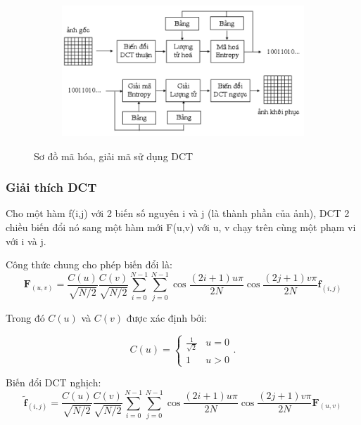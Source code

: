 \begin{figure}
    \begin{subfigure}{0.8\textwidth}
        \includegraphics[width=1.0\linewidth]{Chapters/items/DCT.jpg}
        \caption{}
        \label{fig: dct}
    \end{subfigure}
    \caption{Sơ đồ mã hóa, giải mã sử dụng DCT}
\end{figure}

\subsubsection{Giải thích DCT}
Cho một hàm f(i,j) với 2 biến số nguyên i và j (là thành phần của ảnh),
DCT 2 chiều biến đổi nó sang một hàm mới F(u,v) với u, v chạy trên
cùng một phạm vi với i và j.

Công thức chung cho phép biến đổi là:
\begin{equation*}
    \mathbf{F}_{(u,v)} = \frac{C(u)}{\sqrt{N/2}} \frac{C(v)}{\sqrt{N/2}} \sum_{i=0}^{N-1} \sum_{j=0}^{N-1}  \cos \frac{(2i+1)u\pi}{2N} \cos\frac{(2j+1)v\pi}{2N} \mathbf{f}_{(i,j)}
\end{equation*}

Trong đó ${C(u)}$ và ${C(v)}$ được xác định bởi:

\begin{equation*}
    C(u) = \begin{cases} \frac{1}{\sqrt{2}} & u = 0 \\ 1 & u>0 \end{cases}\text{.}
\end{equation*}

Biến đổi DCT nghịch:
\begin{equation*}
    \mathbf{\tilde{f}}_{(i,j)} = \frac{C(u)}{\sqrt{N/2}} \frac{C(v)}{\sqrt{N/2}} \sum_{i=0}^{N-1} \sum_{j=0}^{N-1}  \cos \frac{(2i+1)u\pi}{2N} \cos\frac{(2j+1)v\pi}{2N} \mathbf{F}_{(u,v)}
\end{equation*}

